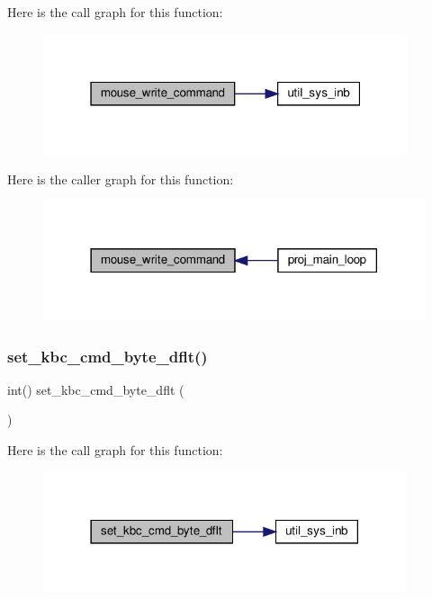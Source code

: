 Here is the call graph for this function\+:\nopagebreak
\begin{figure}[H]
\begin{center}
\leavevmode
\includegraphics[width=304pt]{group__mouse_ga090c9bebd05709adc5de77ab5b26d7c3_cgraph}
\end{center}
\end{figure}
Here is the caller graph for this function\+:\nopagebreak
\begin{figure}[H]
\begin{center}
\leavevmode
\includegraphics[width=318pt]{group__mouse_ga090c9bebd05709adc5de77ab5b26d7c3_icgraph}
\end{center}
\end{figure}
\mbox{\label{group__mouse_gae5083fea5f4e764204c98e646ac25cc6}} 
\subsubsection{\texorpdfstring{set\+\_\+kbc\+\_\+cmd\+\_\+byte\+\_\+dflt()}{set\_kbc\_cmd\_byte\_dflt()}}
{\footnotesize\ttfamily int() set\+\_\+kbc\+\_\+cmd\+\_\+byte\+\_\+dflt (\begin{DoxyParamCaption}{ }\end{DoxyParamCaption})}

Here is the call graph for this function\+:\nopagebreak
\begin{figure}[H]
\begin{center}
\leavevmode
\includegraphics[width=302pt]{group__mouse_gae5083fea5f4e764204c98e646ac25cc6_cgraph}
\end{center}
\end{figure}
\mbox{\label{group__mouse_ga8931196769eb020bd34b8b93ee8c1ef6}} 
